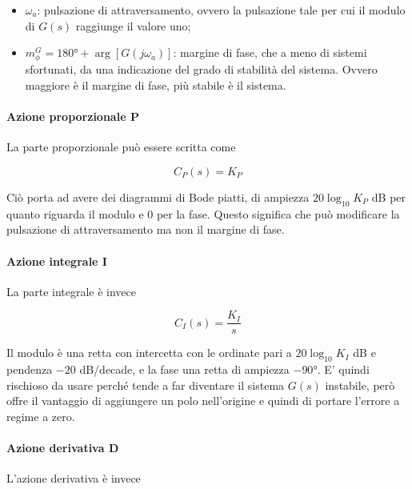 \documentclass[english]{article}
\begin{document}
		\begin{itemize}
			\item $\omega_a$: pulsazione di attraversamento, ovvero la pulsazione tale per cui il modulo di $G(s)$ raggiunge il valore uno;
			\item $m_{\phi}^G=180°+\arg[G(j\omega_a)]$: margine di fase, che a meno di sistemi sfortunati, da una  indicazione del grado di stabilità del sistema. Ovvero maggiore è il margine di fase, più stabile è il sistema.		 
		\end{itemize}
		
		\paragraph{Azione proporzionale P} 
	   	\label{par:P}
	   		\leavevmode\newline
	   		La parte proporzionale può essere scritta come 
	   		
	   		\begin{equation*}
	   			C_P(s)=K_P
	   		\end{equation*}
	   		
	   		\noindent Ciò porta ad avere dei diagrammi di Bode piatti, di ampiezza $20\log_{10}K_P$ dB per quanto riguarda il modulo e 0 per la fase. Questo significa che può modificare la pulsazione di attraversamento ma non il margine di fase.
	   		
	   	\paragraph{Azione integrale I}
	   	\label{par:I}
	   		\leavevmode\newline
	   		La parte integrale è invece
	   		
	   		\begin{equation*}
		   		C_I(s)=\frac{K_I}{s}
	   		\end{equation*}	
	   		
	   		\noindent Il modulo è una retta con intercetta con le ordinate pari a $20\log_{10}K_I$ dB e pendenza $-20$ dB/decade, e la fase una retta di ampiezza $-90°$. E' quindi rischioso da usare perché tende a far diventare il sistema $G(s)$ instabile, però offre il vantaggio di aggiungere un polo nell'origine e quindi di portare l'errore a regime a zero.
	   		
	   	\paragraph{Azione derivativa D}
	   	\label{par:D}
	   		\leavevmode\newline
	   		L'azione derivativa è invece
	   		
\end{document}
